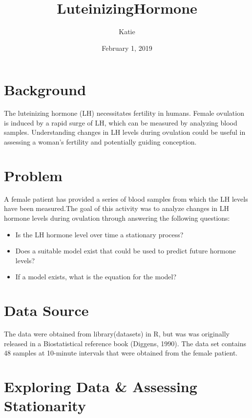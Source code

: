 \documentclass[]{article}
\title{LuteinizingHormone}
\author{Katie}
\date{February 1, 2019}
\providecommand{\tightlist}{%
  \setlength{\itemsep}{0pt}\setlength{\parskip}{0pt}}
\begin{document}
\maketitle

\section{Background}\label{background}

The luteinizing hormone (LH) necessitates fertility in humans. Female
ovulation is induced by a rapid surge of LH, which can be measured by
analyzing blood samples. Understanding changes in LH levels during
ovulation could be useful in assessing a woman's fertility and
potentially guiding conception.

\section{Problem}\label{problem}

A female patient has provided a series of blood samples from which the
LH levels have been measured.The goal of this activity was to analyze
changes in LH hormone levels during ovulation through answering the
following questions:

\begin{itemize}
\tightlist
\item
  Is the LH hormone level over time a stationary process?
\item
  Does a suitable model exist that could be used to predict future
  hormone levels?
\item
  If a model exists, what is the equation for the model?
\end{itemize}

\section{Data Source}\label{data-source}

The data were obtained from library(datasets) in R, but was was
originally released in a Biostatistical reference book (Diggens, 1990).
The data set contains 48 samples at 10-minute intervals that were
obtained from the female patient.

\section{Exploring Data \& Assessing
Stationarity}\label{exploring-data-assessing-stationarity}
\end{document}
